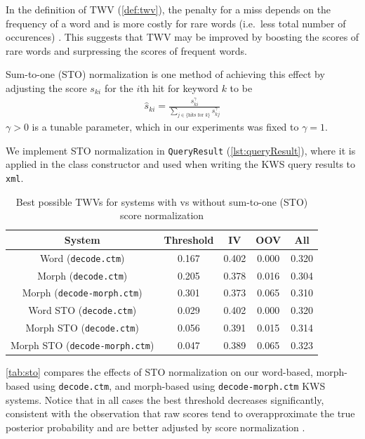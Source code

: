 \documentclass[a4paper,oneside,reqno]{amsart}
\begin{document}
In the definition of TWV (\autoref{def:twv}), the penalty for a miss depends
on the frequency of a word and is more costly for rare words (i.e.\ less total
number of occurences) \cite{wang2014depth}. This suggests that TWV may be
improved by boosting the scores of rare words and surpressing the scores of
frequent words.

Sum-to-one (STO) normalization is one method of achieving this
effect by adjusting the score $s_{ki}$ for the $i$th hit for keyword $k$ to be
\begin{align}
  \label{eq:sto}
  \hat{s}_{ki} = \frac{s_{ki}^\gamma}{\sum_{j \in \{\text{hits for $k$}\}}  s_{kj}^\gamma}
\end{align}
$\gamma > 0$ is a tunable parameter, which in our experiments was fixed to $\gamma =1$.

We implement STO normalization in \texttt{QueryResult}
(\autoref{lst:queryResult}), where it is applied in the class constructor and
used when writing the KWS query results to \texttt{xml}.

\begin{table}[ht!]
  \begin{tabular}{ccccc}
    \toprule
    System                                & Threshold & IV    & OOV   & All \\
    \midrule
    Word (\texttt{decode.ctm})            & 0.167     & 0.402 & 0.000 & 0.320 \\
    Morph (\texttt{decode.ctm})           & 0.205     & 0.378 & 0.016 & 0.304 \\
    Morph (\texttt{decode-morph.ctm})     & 0.301     & 0.373 & 0.065 & 0.310 \\
    \hline
    Word STO (\texttt{decode.ctm})        & 0.029     & 0.402 & 0.000 & 0.320 \\
    Morph STO (\texttt{decode.ctm})       & 0.056     & 0.391 & 0.015 & 0.314 \\
    Morph STO (\texttt{decode-morph.ctm}) & 0.047     & 0.389 & 0.065 & 0.323 \\
    \bottomrule
  \end{tabular}
  \caption{Best possible TWVs for systems with vs without sum-to-one (STO) score normalization}
  \label{tab:sto}
\end{table}

\autoref{tab:sto} compares the effects of STO normalization on our word-based,
morph-based using \texttt{decode.ctm}, and morph-based using
\texttt{decode-morph.ctm} KWS systems. Notice that in all cases the best
threshold decreases significantly, consistent with the observation that raw
scores tend to overapproximate the true posterior probability and are better
adjusted by score normalization \cite{wang2014depth}.
\end{document}
